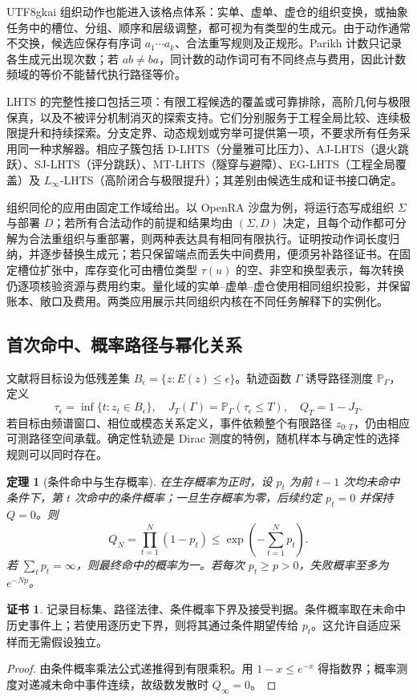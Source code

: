 \documentclass[11pt,a4paper]{article}
\theoremstyle{plain}
\newtheorem{theorem}{定理}[section]
\theoremstyle{definition}
\newtheorem*{certificate}{证书}
\theoremstyle{remark}
\begin{document}
\begin{CJK*}{UTF8}{gkai}
组织动作也能进入该格点体系：实单、虚单、虚仓的组织变换，或抽象任务中的槽位、分组、顺序和层级调整，都可视为有类型的生成元。由于动作通常不交换，候选应保存有序词 $a_1\cdots a_k$、合法重写规则及正规形。Parikh 计数只记录各生成元出现次数；若 $ab\ne ba$，同计数的动作词可有不同终点与费用，因此计数频域的等价不能替代执行路径等价。

LHTS 的完整性接口包括三项：有限工程候选的覆盖或可靠排除，高阶几何与极限保真，以及不被评分机制消灭的探索支持。它们分别服务于工程全局比较、连续极限提升和持续探索。分支定界、动态规划或穷举可提供第一项，不要求所有任务采用同一种求解器。相应子簇包括 D-LHTS（分量雅可比压力）、AJ-LHTS（退火跳跃）、SJ-LHTS（评分跳跃）、MT-LHTS（隧穿与避障）、EG-LHTS（工程全局覆盖）及 $L_\infty$-LHTS（高阶闭合与极限提升）；其差别由候选生成和证书接口确定。

组织同伦的应用由固定工作域给出。以 OpenRA 沙盘为例，将运行态写成组织 $\Sigma$ 与部署 $D$；若所有合法动作的前提和结果均由 $(\Sigma,D)$ 决定，且每个动作都可分解为合法重组织与重部署，则两种表达具有相同有限执行。证明按动作词长度归纳，并逐步替换生成元；若只保留端点而丢失中间费用，便须另补路径证书。在固定槽位扩张中，库存变化可由槽位类型 $\tau(u)$ 的空、非空和换型表示，每次转换仍逐项核验资源与费用约束。量化域的实单--虚单--虚仓使用相同组织投影，并保留账本、敞口及费用。两类应用展示共同组织内核在不同任务解释下的实例化\cite{S17}。

\subsection{首次命中、概率路径与幂化关系}

文献\cite{S33}将目标设为低残差集 $B_\epsilon=\{z:E(z)\le\epsilon\}$。轨迹函数 $\Gamma$ 诱导路径测度 $\mathbb P_\Gamma$，定义
\[
 \tau_\epsilon=\inf\{t:z_t\in B_\epsilon\},\quad
 J_T(\Gamma)=\mathbb P_\Gamma(\tau_\epsilon\le T),\quad
 Q_T=1-J_T.
\]
若目标由频谱窗口、相位或模态关系定义，事件依赖整个有限路径 $z_{0:T}$，仍由相应可测路径空间承载。确定性轨迹是 Dirac 测度的特例，随机样本与确定性的选择规则可以同时存在。

\begin{theorem}[条件命中与生存概率]
\label{ss:survival}
在生存概率为正时，设 $p_t$ 为前 $t-1$ 次均未命中条件下，第 $t$ 次命中的条件概率；一旦生存概率为零，后续约定 $p_t=0$ 并保持 $Q=0$。则
\[
 Q_N=\prod_{t=1}^N(1-p_t)
 \le\exp\left(-\sum_{t=1}^Np_t\right).
\]
若 $\sum_t p_t=\infty$，则最终命中的概率为一。若每次 $p_t\ge p>0$，失败概率至多为 $e^{-Np}$。
\end{theorem}
\begin{certificate}
记录目标集、路径法律、条件概率下界及接受判据。条件概率取在未命中历史事件上；若使用逐历史下界，则将其通过条件期望传给 $p_t$。这允许自适应采样而无需假设独立。
\end{certificate}
\begin{proof}
由条件概率乘法公式递推得到有限乘积。用 $1-x\le e^{-x}$ 得指数界；概率测度对递减未命中事件连续，故级数发散时 $Q_\infty=0$。
\end{proof}


\end{CJK*}
\end{document}
